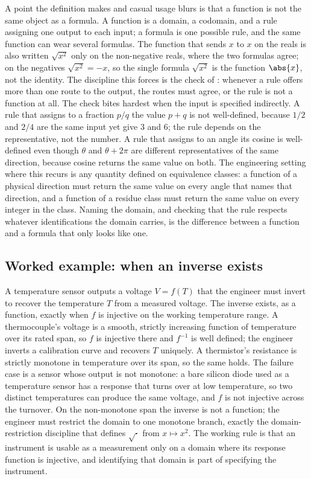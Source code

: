 A point the definition makes and casual usage blurs is that a function is
not the same object as a formula. A function is a domain, a codomain, and
a rule assigning one output to each input; a formula is one possible
rule, and the same function can wear several formulas. The function that
sends $x$ to $x$ on the reals is also written $\sqrt{x^{2}}$ only on the
non-negative reals, where the two formulas agree; on the negatives
$\sqrt{x^{2}} = -x$, so the single formula $\sqrt{x^{2}}$ is the
function $\abs{x}$, not the identity. The discipline this forces is the
check of : whenever a rule offers more than one
route to the output, the routes must agree, or the rule is not a function
at all. The check bites hardest when the input is specified indirectly.
A rule that assigns to a fraction $p/q$ the value $p + q$ is not
well-defined, because $1/2$ and $2/4$ are the same input yet give $3$ and
$6$; the rule depends on the representative, not the number. A rule that
assigns to an angle its cosine is well-defined even though $\theta$ and
$\theta + 2\pi$ are different representatives of the same direction,
because cosine returns the same value on both. The engineering setting
where this recurs is any quantity defined on equivalence classes: a
function of a physical direction must return the same value on every
angle that names that direction, and a function of a residue class must
return the same value on every integer in the class. Naming the domain,
and checking that the rule respects whatever identifications the domain
carries, is the difference between a function and a formula that only
looks like one.

\subsection{Worked example: when an inverse exists}

A temperature sensor outputs a voltage $V = f(T)$ that the engineer
must invert to recover the temperature $T$ from a measured voltage. The
inverse exists, as a function, exactly when $f$ is injective on the
working temperature range. A thermocouple's voltage is a smooth,
strictly increasing function of temperature over its rated span, so
$f$ is injective there and $f^{-1}$ is well defined; the engineer
inverts a calibration curve and recovers $T$ uniquely. A thermistor's
resistance is strictly monotone in temperature over its span, so the
same holds. The failure case is a sensor whose output is not monotone:
a bare silicon diode used as a temperature sensor has a response that
turns over at low temperature, so two distinct temperatures can produce
the same voltage, and $f$ is not injective across the turnover. On the
non-monotone span the inverse is not a function; the engineer must
restrict the domain to one monotone branch, exactly the
domain-restriction discipline that defines $\sqrt{\cdot}$ from
$x \mapsto x^{2}$. The working rule is that an instrument is usable as
a measurement only on a domain where its response function is
injective, and identifying that domain is part of specifying the
instrument.

